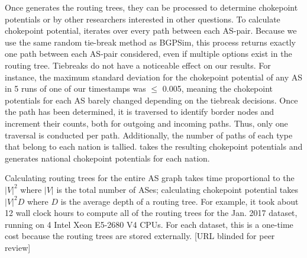 \par Once \toolname{} generates the routing trees, they can be processed to
determine chokepoint potentials or by other researchers interested in other questions. To calculate chokepoint potential, \toolname{} iterates over every path
between each AS-pair. Because we use the same random tie-break method as BGPSim, this process returns 
exactly one path between each AS-pair considered, even if multiple options exist in the
routing tree. Tiebreaks do not have a noticeable effect on our results. For instance, the maximum
standard deviation for the chokepoint potential of any AS in 5 runs of one of our timestamps was 
$\leq$ 0.005, meaning the chokepoint potentials for each AS barely changed depending on the tiebreak
decisions.
Once the path has been determined, it is traversed to identify border nodes and increment their counts, both
for outgoing and incoming paths.  Thus, only one traversal is conducted
per path. Additionally, the number of paths of each type that belong to each
nation is tallied. \toolname{} takes the resulting chokepoint
potentials and generates national chokepoint potentials for each nation.

Calculating routing trees for the entire AS graph takes time proportional to the $|V|^2$ where $|V|$ is the total number of ASes; calculating chokepoint potential takes $|V|^2D$ where $D$ is the average depth of a routing tree. For example,
it took about 12 wall clock hours to compute all of the routing trees for the Jan. 2017 dataset, running on 4 Intel Xeon E5-2680 V4 CPUs.  For each dataset, this is a one-time cost because the routing trees are stored externally.  [URL blinded for peer review] 
